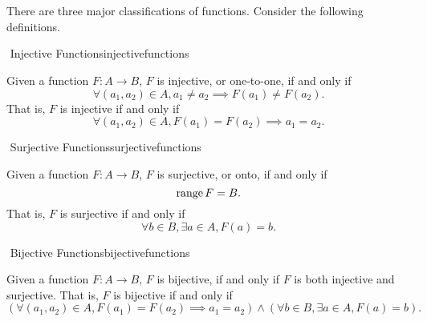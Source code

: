         \pagebreak
        \vphantom
        \\
        \\
        There are three major classifications of functions. Consider the following definitions.
        \begin{definition}{\Stop\,\,Injective Functions}{injectivefunctions}
        
            Given a function \(F:A\to B\), \(F\) is injective, or one-to-one, if and only if
            \begin{equation*}
                \forall (a_1,a_2)\in A,a_1\neq a_2\implies F(a_1)\neq F(a_2).
            \end{equation*}
            That is, \(F\) is injective if and only if
            \begin{equation*}
                \forall (a_1,a_2)\in A, F(a_1)=F(a_2)\implies a_1=a_2.
            \end{equation*}
            
        \end{definition}
        \begin{definition}{\Stop\,\,Surjective Functions}{surjectivefunctions}
        
            Given a function \(F:A\to B\), \(F\) is surjective, or onto, if and only if
            \begin{equation*}
                \text{range\,} F = B.
            \end{equation*}
            That is, \(F\) is surjective if and only if
            \begin{equation*}
                \forall b\in B, \exists a\in A,F(a)=b.
            \end{equation*}
            
        \end{definition}
        \begin{definition}{\Stop\,\,Bijective Functions}{bijectivefunctions}
        
            Given a function \(F:A\to B\), \(F\) is bijective, if and only if \(F\) is both injective and surjective. That is, \(F\) is bijective if and only if
            \begin{equation*}
                (\forall (a_1,a_2)\in A, F(a_1)=F(a_2)\implies a_1=a_2) \wedge (\forall b\in B, \exists a\in A,F(a)=b).
            \end{equation*}
            
        \end{definition}
        \vphantom
